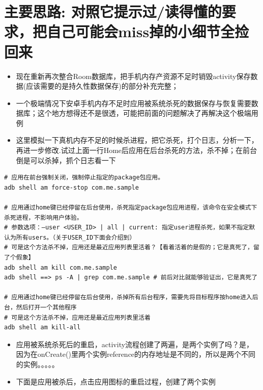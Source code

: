 \documentclass[9pt, b5paper]{article}
\begin{document}
\section{主要思路: \textbf{对照它提示过/读得懂的要求，把自己可能会miss掉的小细节全捡回来}}
\label{sec-2}
\begin{itemize}
\item 现在重新再次整合Room数据库，把手机内存产资源不足时销毁activity保存数据(应该需要的是持久性数据保存)的部分补充完整；
\item 一个极端情况下安卓手机内存不足时应用被系统杀死的数据保存与恢复需要数据库；这个地方想得还不是很透，可能把前面的问题解决了再解决这个极端用例
\item 这里模拟一下真机内存不足的时候杀进程，把它杀死，打个日志，分析一下，再进一步修改.试过上面一行Home后应用在后台杀死的方法，杀不掉；在前台倒是可以杀掉，抓个日志看一下
\end{itemize}
\begin{verbatim}
# 应用在前台强制关闭，强制停止指定的package包应用。
adb shell am force-stop com.me.sample 

# 应用通过home键已经停留在后台使用，杀死指定package包应用进程，该命令在安全模式下杀死进程，不影响用户体验。
# 参数选项：–user <USER_ID> | all | current: 指定user进程杀死，如果不指定默认为所有users。（关于USER_ID下面会介绍到）
# 可是这个方法杀不掉，应用还是最近应用列表里活着？【看着活着的是假的；它是真死了，留了个假象】
adb shell am kill com.me.sample 
adb shell ==> ps -A | grep com.me.sample # 前后对比就能够验证出，它是真死了

# 应用通过home键已经停留在后台使用，杀掉所有后台程序，需要先将目标程序按home进入后台，然后打开一个其他程序
# 可是这个方法杀不掉，应用还是最近应用列表里活着
adb shell am kill-all 　　　　　　　　　　　　　
\end{verbatim}
\begin{itemize}
\item 应用被系统杀死后的重启，activity流程创建了两遍，是两个实例了吗？是，因为在onCreate()里两个实例reference的内存地址是不同的，所以是两个不同的实例。。。。。
\item 下面是应用被杀后，点击应用图标的重启过程，创建了两个实例
\end{itemize}
\end{document}

